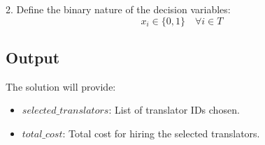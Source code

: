 \documentclass{article}
\begin{document}
2. Define the binary nature of the decision variables:
   \[
   x_i \in \{0, 1\} \quad \forall i \in T
   \]

\subsection*{Output}
The solution will provide:
\begin{itemize}
    \item $selected\_translators$: List of translator IDs chosen.
    \item $total\_cost$: Total cost for hiring the selected translators.
\end{itemize}
\end{document}
